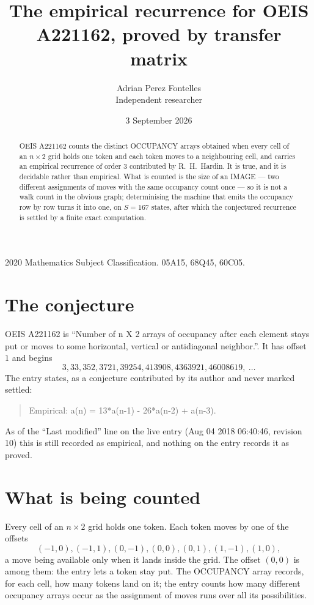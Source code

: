 \documentclass[11pt,a4paper]{article}
\title{The empirical recurrence for OEIS A221162, proved by transfer matrix}
\author{Adrian Perez Fontelles\\ \small Independent researcher}
\date{3 September 2026}
\theoremstyle{plain}
\theoremstyle{definition}
\begin{document}
\maketitle

\begin{abstract}
OEIS A221162 counts the distinct OCCUPANCY arrays obtained when every cell of an $n\times2$ grid
holds one token and each token moves to a neighbouring cell, and carries an empirical
recurrence of order $3$ contributed by R.~H.~Hardin. It is true, and it is decidable
rather than empirical. What is counted is the size of an IMAGE --- two different assignments of
moves with the same occupancy count once --- so it is not a walk count in the obvious graph;
determinising the machine that emits the occupancy row by row turns it into one, on $S=167$
states, after which the conjectured recurrence is settled by a finite exact computation.
\end{abstract}

\noindent\small 2020 Mathematics Subject Classification. 05A15, 68Q45, 60C05.\normalsize

\section{The conjecture}

OEIS A221162 is ``Number of n X 2 arrays of occupancy after each element stays put or moves to some horizontal, vertical or antidiagonal neighbor.''. It has offset $1$ and begins
\[
3, 33, 352, 3721, 39254, 413908, 4363921, 46008619,\ \dots
\]
The entry states, as a conjecture contributed by its author and never marked settled:
\begin{quote}
Empirical: a(n) = 13*a(n-1) - 26*a(n-2) + a(n-3).
\end{quote}
As of the ``Last modified'' line on the live entry (Aug 04 2018 06:40:46, revision 10) this is still
recorded as empirical, and nothing on the entry records it as proved.

\section{What is being counted}

Every cell of an $n\times2$ grid holds one token. Each token moves by one of the offsets
\[
(-1,0), (-1,1), (0,-1), (0,0), (0,1), (1,-1), (1,0),
\]
a move being available only when it lands inside the grid. The offset $(0,0)$ is among them: the entry lets a token stay put. The OCCUPANCY array
records, for each cell, how many tokens land on it; the entry counts how many different
occupancy arrays occur as the assignment of moves runs over all its possibilities.
\end{document}
